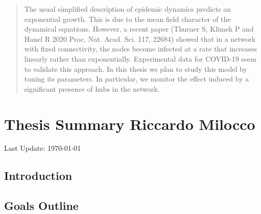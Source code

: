 \documentclass[a4paper,11pt,twoside]{report} %
\begin{document}

\newcommand{\changefont}{%
    \fontsize{7}{12}\selectfont
}
\fancyhf{}
\fancyhead[LE,RO]{\changefont \slshape \rightmark} %
\fancyhead[RE,LO]{\changefont \slshape \leftmark} %
\fancyfoot[C]{\thepage}
\pagestyle{fancy}



\begin{abstract}
The usual simplified description of epidemic dynamics predicts an exponential growth. This is due to the mean field character of the
dynamical equations. However, a recent paper (Thurner S, Klimek P and Hanel R 2020 Proc. Nat. Acad. Sci. 117, 22684) \cite{Thurner::NetBasedExpl} showed
that in a network with fixed connectivity, the nodes become infected at a rate that increases linearly rather than exponentially.
Experimental data for COVID-19 seem to validate this approach. In this thesis we plan to study this model by tuning its parameters.
In particular, we monitor the effect induced by a significant presence of hubs in the network.
\end{abstract}


\chapter[Introduction]{Thesis Summary Riccardo Milocco}
%

Last Update: \today

\section{Introduction}

\section{Goals Outline}
\end{document}
